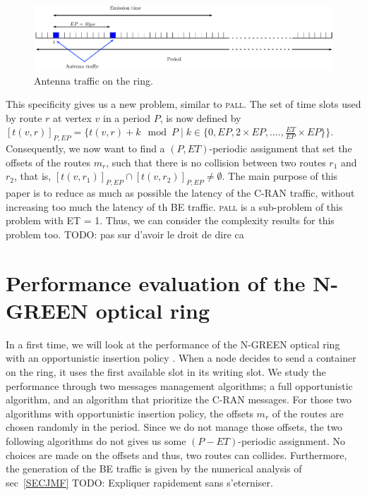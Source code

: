\documentclass[a4paper,10pt,french,english]{article}
\newcommand\pall{\textsc{pall}\xspace}
\newcommand{\todo}[1]{{\color{red} TODO: {#1}}}
\begin{document}
        \begin{figure}[h!]
\begin{center}   

      \includegraphics[width=\textwidth]{emission_antenna.pdf}
     \caption{Antenna traffic on the ring.}
\end{center}
  \end{figure}
  
  This specificity gives us a new problem, similar to \pall. The set of time slots used by route $r$ at vertex $v$ in a period $P$, is now defined by $[t(v,r)]_{P,EP} = \{t(v,r) +k \mod P \mid k \in \{0,EP,2\times EP,...., \frac{ET}{EP}\times EP\} \}$. Consequently, we now want to find a $(P,ET)$-periodic assignment that set the offsets of the routes $m_r$, such that there is no collision between two routes $r_1$ and $r_2$, that is, $[t(v,r_{1})]_{P,EP} \cap [t(v,r_{2})]_{P,EP} \neq \emptyset$. 
  The main purpose of this paper is to reduce as much as possible the latency of the C-RAN traffic, without increasing too much the latency of th BE traffic.
  \pall is a sub-problem of this problem with ET = 1. Thus, we can consider the complexity results for this problem too.
  \todo{pas sur d'avoir le droit de dire ca}

  
   \section{Performance evaluation of the N-GREEN optical ring}
   In a first time, we will look at the performance of the N-GREEN optical ring with an opportunistic insertion policy \cite{refngreen?}. When a node decides to send a container on the ring, it uses the first available slot in its writing slot.
    We study the performance through two messages management algorithms; a full opportunistic algorithm, and an algorithm that prioritize the C-RAN messages.
   For those two algorithms with opportunistic insertion policy, the offsets $m_r$ of the routes are chosen randomly in the period. 
   Since we do not manage those offsets, the two following algorithms do not gives us some $(P-ET)$-periodic assignment. No choices are made on the offsets and thus, two routes can collides. Furthermore, the generation of the BE traffic is given by the numerical analysis of sec~\ref{SECJMF}
   \todo{Expliquer rapidement sans s'eterniser.}
    
\end{document}
